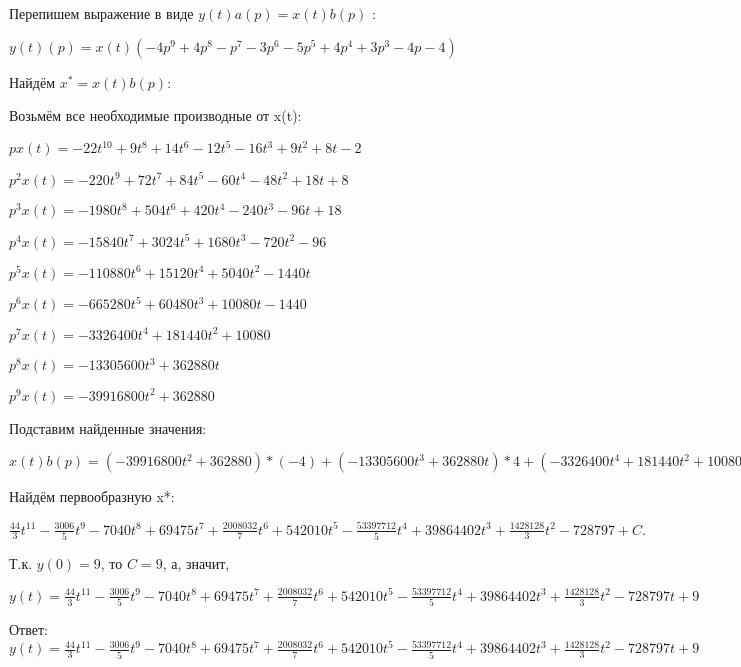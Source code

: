 \documentclass{article}
\begin{document}
{{{Перепишем выражение в виде $y(t)a(p)=x(t)b(p)$ :

$y(t)(p)=x(t)(-4p^{9}+4p^{8}-p^{7}-3p^{6}-5p^{5}+4p^{4}+3p^{3}-4p-4)$

Найдём $x^*=x(t)b(p)$:

Возьмём все необходимые производные от x(t):

$px(t)=-22t^{10}+9t^{8}+14t^{6}-12t^{5}-16t^{3}+9t^{2}+8t-2$

$p^2x(t)=-220t^{9}+72t^{7}+84t^{5}-60t^{4}-48t^{2}+18t+8$

$p^3x(t)=-1980t^{8}+504t^{6}+420t^{4}-240t^{3}-96t+18$

$p^4x(t)=-15840t^{7}+3024t^{5}+1680t^{3}-720t^{2}-96$

$p^5x(t)=-110880t^{6}+15120t^{4}+5040t^{2}-1440t$

$p^6x(t)=-665280t^{5}+60480t^{3}+10080t-1440$

$p^7x(t)=-3326400t^{4}+181440t^{2}+10080$

$p^8x(t)=-13305600t^{3}+362880t$

$p^9x(t)=-39916800t^{2}+362880$

Подставим найденные значения:

$x(t)b(p) = (-39916800t^{2}+362880)*(-4)+(-13305600t^{3}+362880t)*4+(-3326400t^{4}+181440t^{2}+10080)*(-1)+(-665280t^{5}+60480t^{3}+10080t-1440)*(-3)+(-110880t^{6}+15120t^{4}+5040t^{2}-1440t)*(-5)+(-15840t^{7}+3024t^{5}+1680t^{3}-720t^{2}-96)*4+(-1980t^{8}+504t^{6}+420t^{4}-240t^{3}-96t+18)*3+(-22t^{10}+9t^{8}+14t^{6}-12t^{5}-16t^{3}+9t^{2}+8t-2)*(-4)+(-22t^{10}+9t^{8}+14t^{6}-12t^{5}-16t^{3}+9t^{2}+8t-2)*(-4)=176t^{10}-6012t^{8}-63360t^{7}+555800t^{6}+2008032t^{5}+3252060t^{4}-53397712t^{3}+159457608t^{2}+1428128t$





Найдём первообразную x*:

$\frac{44}{3}t^{11}-\frac{3006}{5}t^{9}-7040t^{8}+69475t^{7}+\frac{2008032}{7}t^{6}+542010t^{5}-\frac{53397712}{5}t^{4}+39864402t^{3}+\frac{1428128}{3}t^{2}-728797+C.$

Т.к. $y(0)=9$, то $C=9$, а, значит, 

$y(t)=\frac{44}{3}t^{11}-\frac{3006}{5}t^{9}-7040t^{8}+69475t^{7}+\frac{2008032}{7}t^{6}+542010t^{5}-\frac{53397712}{5}t^{4}+39864402t^{3}+\frac{1428128}{3}t^{2}-728797t+9$

Ответ: $y(t) = \frac{44}{3}t^{11}-\frac{3006}{5}t^{9}-7040t^{8}+69475t^{7}+\frac{2008032}{7}t^{6}+542010t^{5}-\frac{53397712}{5}t^{4}+39864402t^{3}+\frac{1428128}{3}t^{2}-728797t+9$

}}}
\end{document}
